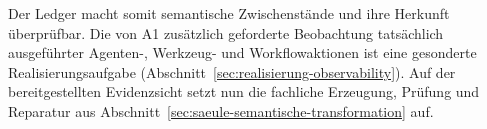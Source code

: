 Der Ledger macht somit semantische Zwischenstände und ihre Herkunft
überprüfbar. Die von A1 zusätzlich geforderte Beobachtung tatsächlich
ausgeführter Agenten-, Werkzeug- und Workflowaktionen ist eine
gesonderte Realisierungsaufgabe
(Abschnitt~\ref{sec:realisierung-observability}). Auf der
bereitgestellten Evidenzsicht setzt nun die fachliche Erzeugung,
Prüfung und Reparatur aus
Abschnitt~\ref{sec:saeule-semantische-transformation} auf.
